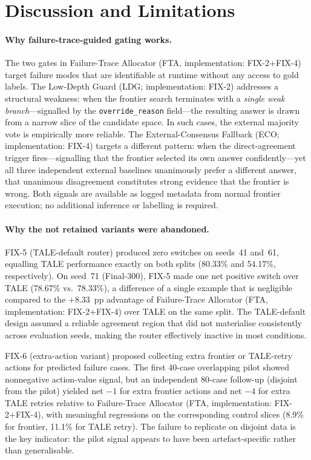 \section{Discussion and Limitations}
\label{sec:discussion}

\paragraph{Why failure-trace-guided gating works.}
The two gates in Failure-Trace Allocator (FTA, implementation: FIX-2+FIX-4) target failure modes that are identifiable at runtime
without any access to gold labels.
The Low-Depth Guard (LDG; implementation: FIX-2) addresses a structural weakness: when the frontier search
terminates with a \textit{single weak branch}---signalled by the \texttt{override\_reason}
field---the resulting answer is drawn from a narrow slice of the candidate space.
In such cases, the external majority vote is empirically more reliable.
The External-Consensus Fallback (ECO; implementation: FIX-4) targets a different pattern: when the
direct-agreement trigger fires---signalling that the frontier selected its own answer
confidently---yet all three independent external baselines unanimously prefer a different
answer, that unanimous disagreement constitutes strong evidence that the frontier is wrong.
Both signals are available as logged metadata from normal frontier execution;
no additional inference or labelling is required.

\paragraph{Why the not retained variants were abandoned.}
FIX-5 (TALE-default router) produced zero switches on seeds~41 and~61,
equalling TALE performance exactly on both splits (80.33\% and 54.17\%,
respectively).
On seed~71 (Final-300), FIX-5 made one net positive switch over TALE
(78.67\% vs.\ 78.33\%), a difference of a single example that is negligible
compared to the $+8.33$~pp advantage of Failure-Trace Allocator (FTA, implementation: FIX-2+FIX-4) over TALE on the same split.
The TALE-default design assumed a reliable agreement region that did not materialise
consistently across evaluation seeds, making the router effectively inactive in most
conditions.

FIX-6 (extra-action variant) proposed collecting extra frontier or TALE-retry actions for predicted
failure cases.
The first 40-case overlapping pilot showed nonnegative action-value signal, but
an independent 80-case follow-up (disjoint from the pilot) yielded
net $-1$ for extra frontier actions and net $-4$ for extra TALE retries relative to Failure-Trace Allocator (FTA, implementation: FIX-2+FIX-4),
with meaningful regressions on the corresponding control slices (8.9\% for frontier, 11.1\% for TALE retry).
The failure to replicate on disjoint data is the key indicator: the pilot signal
appears to have been artefact-specific rather than generalisable.

